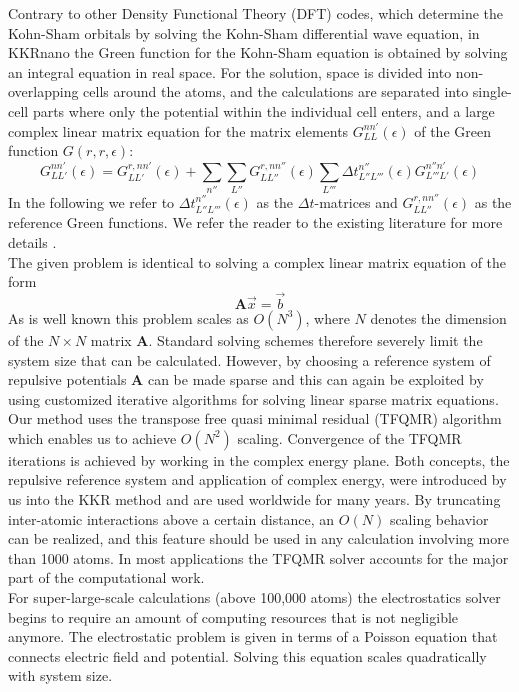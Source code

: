 \documentclass [a4paper, 12pt]{article}
\newcommand{\matr}[1]{\bm{#1}}
\begin{document}
Contrary to other Density Functional Theory (DFT) codes, which determine the Kohn-Sham orbitals by solving
the Kohn-Sham differential wave equation, in KKRnano the Green function for the Kohn-Sham
equation is obtained by solving an integral equation in real space. For the solution, space is divided
into non-overlapping cells around the atoms, and the calculations are separated into single-cell parts
where only the potential within the individual cell enters, and a large complex linear matrix equation for 
the matrix elements $G_{LL}^{nn'} (\epsilon)$ of the Green function $G(r, r , \epsilon)$:
\begin{equation}
	G_{LL'}^{nn'} (\epsilon) = G_{LL'}^{r,nn'} (\epsilon) + \sum_{n''} \sum_{L''}
	G_{LL''}^{r,nn''} (\epsilon) \sum_{L'''} \Delta t_{L'' L'''}^{n''} (\epsilon)
	G_{L'''L'}^{n''n'} (\epsilon)
	\label{eq:dyson_eq}
\end{equation}
In the following we refer to $\Delta t_{L'' L'''}^{n''} (\epsilon)$ as the $\Delta t$-matrices and
$G_{LL''}^{r,nn''} (\epsilon)$ as the reference Green functions. We refer the reader to the existing
literature for more details \cite{zeller_towards_2008}.
\\
The given problem is identical to solving a complex linear matrix equation of the form
\begin{equation}
	\label{eq:axb}
	\matr{A} \vec{x} = \vec{b}
\end{equation}
As is well known this problem scales as $O(N^3)$, where $N$ denotes the dimension of the $N \times N$
matrix $\matr{A}$. Standard solving schemes therefore severely limit the system size that can
be calculated.
However, by choosing a reference system of repulsive potentials
$\matr{A}$ can be made sparse and this can again be exploited
by using customized iterative algorithms for solving linear sparse matrix equations.
Our method uses the transpose free quasi minimal residual (TFQMR) algorithm \cite{freund_qmr:_1991}
which enables us to achieve $O(N^2)$ scaling. 
Convergence of the TFQMR iterations is achieved by working in the complex energy plane. Both concepts,
the repulsive reference system and application of complex energy, were
introduced by us into the KKR method \cite{zeller_application_1982,zeller_theory_1995}
and are used worldwide for many years. 
By truncating inter-atomic interactions above a certain distance, an $O(N)$ scaling 
behavior can be realized, and this feature should be used in any calculation involving more than 1000 atoms.
In most applications the TFQMR solver accounts for the major part of the computational work.
\\
For super-large-scale calculations (above 100,000 atoms) the electrostatics solver begins
to require an amount of computing resources that is not negligible anymore. 
The electrostatic problem is given in terms of a Poisson equation that connects electric field and potential. 
Solving this equation scales quadratically with system size. 
\end{document}
